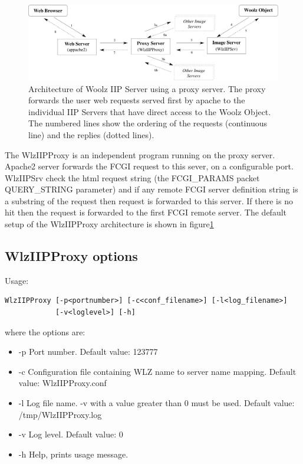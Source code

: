 \documentclass[11pt]{article}
\begin{document}
\begin{figure}[!htb]
\includegraphics[width=\linewidth]{proxyarchit}
\caption{Architecture of Woolz IIP Server using a proxy server.
The proxy forwards the user web requests served first by apache
to the individual IIP Servers that have direct access to the Woolz
Object. The numbered lines show the ordering of the requests (continuous
line) and the replies (dotted lines).}
\label{fig:proxyarchit}
\end{figure}


The WlzIIPProxy is an independent program running on the proxy
server. Apache2 server forwards the FCGI request to this sever,
on a configurable port. WlzIIPSrv check the html request string
(the FCGI\_PARAMS packet QUERY\_STRING parameter) and if any
remote FCGI server definition string is a substring of the
request then request is forwarded to this server. If there is no
hit then the request is forwarded to the first FCGI remote server.
The default setup of the WlzIIPProxy architecture is shown in
figure\ref{fig:proxyarchit}


\subsection{WlzIIPProxy options}
Usage:
\begin{verbatim}
WlzIIPProxy [-p<portnumber>] [-c<conf_filename>] [-l<log_filename>]
            [-v<loglevel>] [-h]
\end{verbatim}

where the options are:
\begin{itemize}
\item -p  Port number. Default value: 123777
\item -c  Configuration file containing WLZ name to server name mapping.
          Default value: \mbox{WlzIIPProxy.conf}
\item -l  Log file name. -v with a value greater than 0 must be used.
          Default value: \mbox{/tmp/WlzIIPProxy.log}
\item -v  Log level. Default value: 0
\item -h  Help, prints usage message.
\end{itemize}
\end{document}
